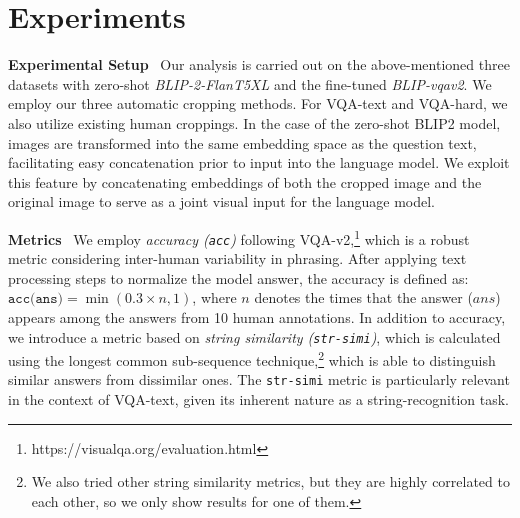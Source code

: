 \section{Experiments}



\textbf{Experimental Setup}~
Our analysis is carried out on the above-mentioned three datasets with zero-shot \textit{BLIP-2-FlanT5XL} and the fine-tuned \textit{BLIP-vqav2}.  We employ our three automatic cropping methods. For VQA-text and VQA-hard, we also utilize existing human croppings. %
In the case of the zero-shot BLIP2 model, images are transformed into the same embedding space as the question text, facilitating easy concatenation prior to input into the language model. We exploit this feature by concatenating embeddings of both the cropped image and the original image to serve as a joint visual input for the language model. 



\textbf{Metrics}~
We employ \textit{accuracy (\texttt{acc})} following VQA-v2,\footnote{ \scriptsize https://visualqa.org/evaluation.html} which is a robust metric considering inter-human variability in phrasing. After applying text processing steps to normalize the model answer, the accuracy is defined as:
$\texttt{acc(ans)} = \min(0.3\times n, 1)$, where $n$ denotes the times that the answer ($ans$) appears among the answers from 10 human annotations. In addition to accuracy, we introduce a metric based on \textit{string similarity (\texttt{str-simi})}, which is calculated using the longest common sub-sequence technique,\footnote{ \scriptsize We also tried other string similarity metrics, but they are highly correlated to each other, so we only show results for one of them.} which is able to distinguish similar answers from dissimilar ones. The \texttt{str-simi} metric is particularly relevant in the context of VQA-text, given its inherent nature as a string-recognition task.

